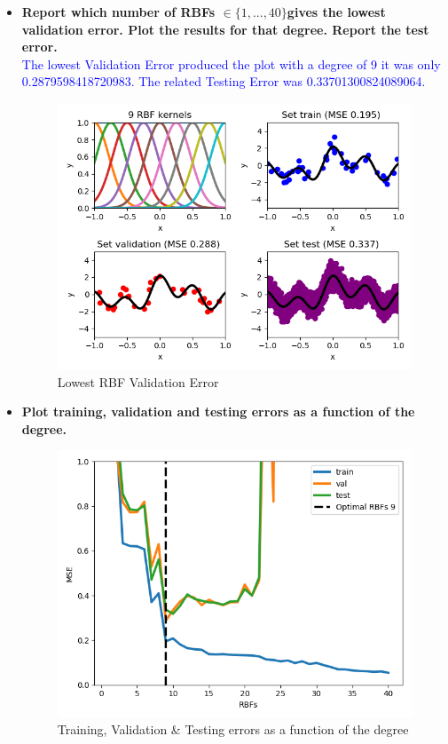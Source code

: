 \documentclass[a4paper]{article}
\begin{document}
\begin{itemize}
\item \textbf{Report which number of RBFs $∈ \{1, . . . , 40\} $gives the lowest validation error. Plot the results for that degree. Report the test error.} \\
\textcolor{blue}{ The lowest Validation Error produced the plot with a degree of 9 it was only 0.2879598418720983. The related Testing Error was 0.33701300824089064.}
\begin{figure}[ht]
    \centering
  \includegraphics[scale=0.50]{plots/plot_rbf_degree9.png}
 \captionsetup{justification=centering}
  \caption{Lowest RBF Validation Error}
\label{plot_rbf_degree9_lowest_validation_error}
  \end{figure}
  
\newpage
  
\item \textbf{Plot training, validation and testing errors as a function of the degree.} \\
\begin{figure}[ht]
    \centering
  \includegraphics[scale=0.35]{plots/plot_rbf_function_of_degree.png}
 \captionsetup{justification=centering}
   \caption{Training, Validation \& Testing errors as a function of the degree}
   \label{plot_rbf_function_of_polynomial_degree}
  \end{figure}


\end{itemize}
\end{document}
